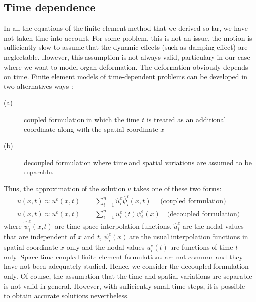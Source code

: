 	\subsection{Time dependence}
In all the equations of the finite element method that we derived so far, we have not taken time into account. For some problem, this is not an issue, the motion is sufficiently slow to assume that the dynamic effects (such as damping effect) are neglectable. However, this assumption is not always valid, particulary in our case where we want to model organ deformation. The deformation obviously depends on time. Finite element models of time-dependent problems can be developed in two alternatives ways \citep{Reddy93}:
\begin{description}
\item[(a)] coupled formulation in which the time $ t $ is treated as an additional coordinate along with the spatial coordinate $ x $
\item[(b)] decoupled formulation where time and spatial variations are assumed to be separable.
\end{description}
Thus, the approximation of the solution $ u $ takes one of these two forms:
\begin{align}
u(x, t) \approx u^e(x, t) &= \sum_{i=1}^n \hat{u}^e_i \hat{\psi}^e_i(x, t)  \quad \text{ (coupled formulation)} \label{chap3:approxTime1}\\
u(x, t) \approx u^e(x, t) &= \sum_{i=1}^n u^e_i(t) \psi^e_i(x) \quad \text{(decoupled formulation)} \label{chap3:approxTime2}
\end{align}
where $ \hat{\psi}^e_i(x, t) $ are time-space interpolation functions, $ \hat{u}^e_i $ are the nodal values that are independent of $ x $ and $ t $, $ \psi^e_i(x) $ are the usual interpolation functions in spatial coordinate $ x $ only and the nodal values $ u^e_i(t) $ are functions of time $ t $ only. Space-time coupled finite element formulations are not common and they have not been adequately studied. Hence, we consider the decoupled formulation only. Of course, the assumption that the time and spatial variations are separable is not valid in general. However, with sufficiently small time steps, it is possible to obtain accurate solutions nevertheless. 

	
